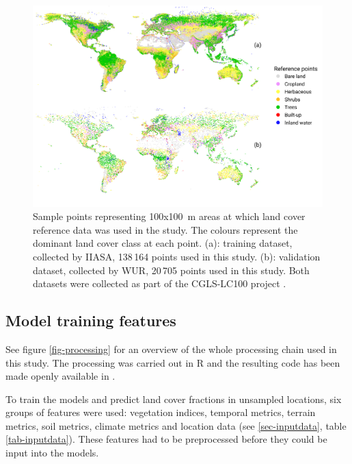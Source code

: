 \documentclass[review,authoryear,3p]{elsarticle}
\begin{document}
\begin{figure}
 \includegraphics[width=\textwidth]{article-figures/maps/2020-10-12-training-and-validation}
 \caption{Sample points representing 100x100~m areas at which land cover reference data was used in the study. The colours represent the dominant land cover class at each point. (a): training dataset, collected by \gls{IIASA}, 138\,164 points used in this study. (b): validation dataset, collected by \gls{WUR}, 20\,705 points used in this study. Both datasets were collected as part of the \ac{CGLS-LC100} project \citep{buchhorn_copernicus_2020}.}
 \label{fig-reference-data}
\end{figure}

\subsection{Model training features}

See figure \ref{fig-processing} for an overview of the whole processing chain used in this study.
The processing was carried out in R \citep{r_2019} and the resulting code has been made openly available in \citet{dainius_masiliunas_2020_3973123}.

To train the models and predict land cover fractions in unsampled locations, six groups of features were used: vegetation indices, temporal metrics, terrain metrics, soil metrics, climate metrics and location data (see \ref{sec-inputdata}, table \ref{tab-inputdata}).
These features had to be preprocessed before they could be input into the models.
\end{document}

